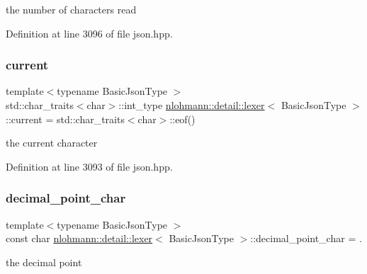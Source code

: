 the number of characters read 



Definition at line 3096 of file json.\+hpp.

\mbox{\label{classnlohmann_1_1detail_1_1lexer_a47169f9aaf0da4c9885e61d3109859aa}} 
\subsubsection{\texorpdfstring{current}{current}}
{\footnotesize\ttfamily template$<$typename Basic\+Json\+Type $>$ \\
std\+::char\+\_\+traits$<$char$>$\+::int\+\_\+type \hyperlink{classnlohmann_1_1detail_1_1lexer}{nlohmann\+::detail\+::lexer}$<$ Basic\+Json\+Type $>$\+::current = std\+::char\+\_\+traits$<$char$>$\+::eof()\hspace{0.3cm}{\ttfamily [private]}}



the current character 



Definition at line 3093 of file json.\+hpp.

\mbox{\label{classnlohmann_1_1detail_1_1lexer_a16593b0475f6d1cddd5eaf7c045771f3}} 
\subsubsection{\texorpdfstring{decimal\+\_\+point\+\_\+char}{decimal\_point\_char}}
{\footnotesize\ttfamily template$<$typename Basic\+Json\+Type $>$ \\
const char \hyperlink{classnlohmann_1_1detail_1_1lexer}{nlohmann\+::detail\+::lexer}$<$ Basic\+Json\+Type $>$\+::decimal\+\_\+point\+\_\+char = \textquotesingle{}.\textquotesingle{}\hspace{0.3cm}{\ttfamily [private]}}



the decimal point 



